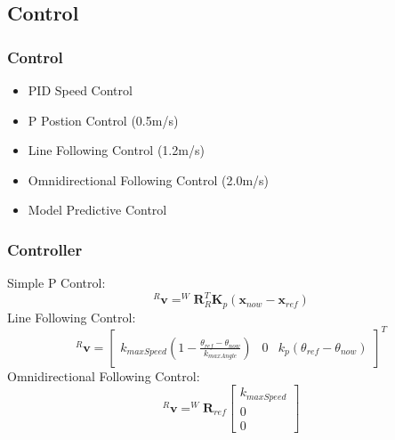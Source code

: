 \documentclass{beamer}
\begin{document}
\subsection{Control}
\begin{frame}
  \frametitle{Control}
  \begin{itemize}
    \item PID Speed Control
    \item P Postion Control (0.5m/s)
    \item Line Following Control (1.2m/s)
    \item Omnidirectional Following Control (2.0m/s)
    \item Model Predictive Control
  \end{itemize}
\end{frame}
\begin{frame}
  \frametitle{Controller}
  Simple P Control:\\
  \begin{equation}
    ^R\mathbf{v} =^W\mathbf{R}_R^T \mathbf{K}_p(\textbf{x}_{now}-\textbf{x}_{ref})
  \end{equation}
  Line Following Control:\\
  \begin{equation}
    ^R\mathbf{v} =
    \begin{bmatrix}
    k_{maxSpeed}(1-\frac{\theta_{ref}-\theta_{now}}{k_{maxAngle}})& 0& k_p(\theta_{ref}-\theta_{now})
    \end{bmatrix}^T
  \end{equation}
  Omnidirectional Following Control:\\
  \begin{equation}
    ^R\mathbf{v} = ^W\mathbf{R}_{ref}\begin{bmatrix}
      k_{maxSpeed}\\0\\0
    \end{bmatrix}
  \end{equation}
\end{frame}
\end{document}
